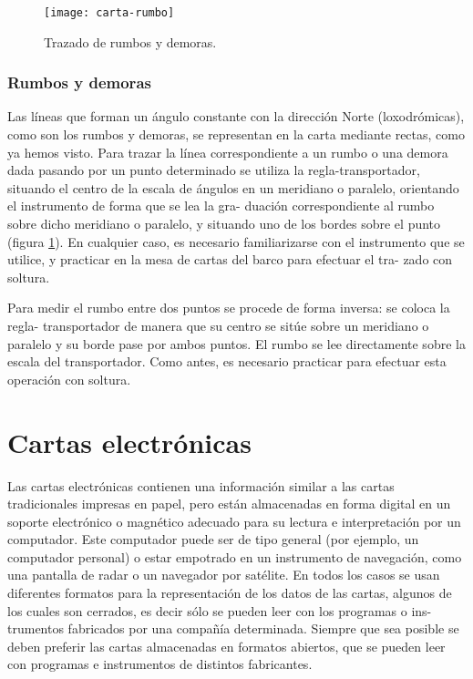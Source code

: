 \begin{figure}[htbp]
\begin{center}
\texttt{[image: carta-rumbo]}
\caption{Trazado de rumbos y demoras.}
\label{fg:carta-rumbo}
\end{center}
\end{figure}

\subsubsection{Rumbos y demoras}

Las líneas que forman un ángulo constante con la dirección Norte (loxodrómicas), como 
son los rumbos y demoras, se representan en la carta mediante rectas, como ya hemos 
visto. Para trazar la línea correspondiente a un rumbo o una demora dada pasando por un 
punto determinado se utiliza la regla-transportador, situando el centro de la escala de 
ángulos en un meridiano o paralelo, orientando el instrumento de forma que se lea la gra- 
duación correspondiente al rumbo sobre dicho meridiano o paralelo, y situando uno de los 
bordes sobre el punto (figura \ref{fg:carta-rumbo}). 
En cualquier caso, es necesario familiarizarse con el 
instrumento que se utilice, y practicar en la mesa de cartas del barco para efectuar el tra- 
zado con soltura. 

Para medir el rumbo entre dos puntos se procede de forma inversa: se coloca la regla- 
transportador de manera que su centro se sitúe sobre un meridiano o paralelo y su borde 
pase por ambos puntos. El rumbo se lee directamente sobre la escala del transportador. 
Como antes, es necesario practicar para efectuar esta operación con soltura. 

\section{Cartas electrónicas}

Las cartas electrónicas contienen una información similar a las cartas tradicionales 
impresas en papel, pero están almacenadas en forma digital en un soporte electrónico o 
magnético adecuado para su lectura e interpretación por un computador. Este computador puede 
ser de tipo general (por ejemplo, un computador personal) o estar empotrado en un 
instrumento de navegación, como una pantalla de radar o un navegador por satélite. En todos 
los casos se usan diferentes formatos para la representación de los datos de las cartas, 
algunos de los cuales son cerrados, es decir sólo se pueden leer con los programas o ins- 
trumentos fabricados por una compañía determinada. Siempre que sea posible se deben 
preferir las cartas almacenadas en formatos abiertos, que se pueden leer con programas e 
instrumentos de distintos fabricantes. 


